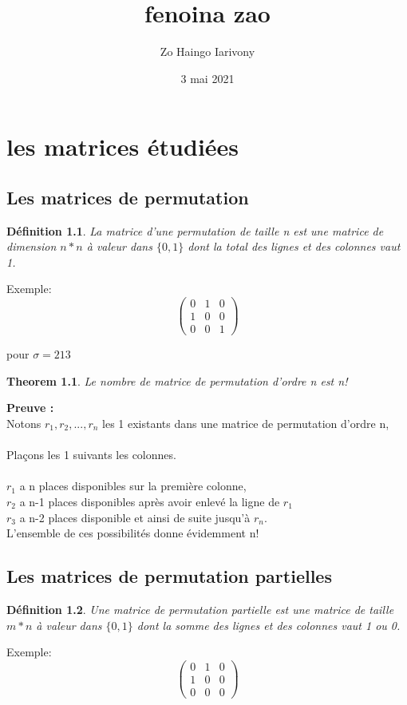 \documentclass{book}
\title{fenoina zao}
\author{Zo Haingo Iarivony \bsc{Rakotoarisoa}}
\date{3 mai 2021}
\newtheorem{theorem}{Theorem}[section]
\newtheorem{petit_nom2}{Définition}[chapter]
\begin{document}
\maketitle
\chapter{les matrices étudiées}
\section{Les matrices de permutation}
\begin{petit_nom2}
La matrice d'une permutation de taille n est une matrice de dimension $n * n$ à valeur dans $\{0,1\}$ dont la total des lignes et des colonnes vaut 1.
\end{petit_nom2} 

Exemple: 
\begin{equation}
\begin{pmatrix}
 0&1&0\\1&0&0\\0&0&1
 \end{pmatrix}
\end{equation}

 pour $\sigma=213$ 
\begin{theorem}
Le nombre de matrice de permutation d'ordre n est n!
\end{theorem} 
\textbf{Preuve : }\\
Notons $r_1, r_2, ..., r_n$ les 1 existants dans une matrice de permutation d'ordre n,\\\\ Plaçons les 1 suivants les colonnes. \\\\
$r_1$ a n places disponibles sur la première colonne,\\ $r_2$ a n-1 places disponibles après avoir enlevé la ligne de $r_1$\\
$r_3$ a n-2 places disponible et ainsi de suite jusqu'à $r_n$. 
\\L'ensemble de ces possibilités donne évidemment n!
 \section{Les matrices de permutation partielles}
 \begin{petit_nom2}
 Une matrice de permutation partielle est une matrice de taille $m*n$ à valeur dans $\{0,1\}$ dont la somme des lignes et des colonnes vaut 1 ou 0.
 \end{petit_nom2}
  Exemple: 
 \begin{equation}
 \begin{pmatrix}
 0&1&0\\1&0&0\\0&0&0
 \end{pmatrix}
 \end{equation}
 
\end{document}
